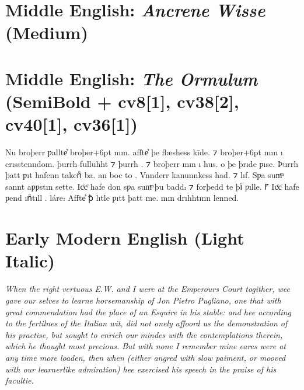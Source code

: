 \documentclass[12pt,letterpaper,openany]{book}
\begin{document}
\section{Middle English: \textit{Ancrene Wisse} (Medium)}

{\large\medium{}}

\section{Middle English: \textit{The Ormulum} (SemiBold + cv8[1], cv38[2], cv40[1], cv36[1])}

{\large\semibold{}
Nu broþerr ƿallte͛ broþer\kern-6ptᫍ\kern+6pt{} mın. affte͛ þe flæshess kīde. ⁊
broþer\kern-6ptᫍ\kern+6pt{} mın ı crısstenndom.
þurrh fulluhht ⁊ þurrh . ⁊ broþerr mın ı  hus.
 o þe þrıde ƿıse.
Þurrh þatt ƿıt hafenn takenᷠ ba. an  boc to .
Vnnderr kanunnkess had.
⁊ lıf. Sƿa sumͫ sannt aƿƿstın sette. Icͨcͨ hafe don sƿa sumͫ þu badd⹎ ⁊ forþedd te
þıᷠ ƿılle. ⹍ Icͨcͨ hafe ƿend ınᷠtıll . 
 láre⹎ Affte͛ ꝥ lıtᫎle
ƿıtt þatt me. mın drıhhtınn  lenned.}

\section{Early Modern English (Light Italic)}

\textit{\large\itallight{}When the right vertuous E.W. and I were at the Emperours Court to\-gither, wee gave our selves to learne horsemanship of Jon Pietro Pugliano, one that with great commendation had the place of an Esquire in his stable: and hee according to the fertilnes of the Italian wit, did not onely affoord us the demonstration of his practise, but sought to enrich our \mbox{mindes} with the contemplations therein, which he thought most precious. But with none I remember mine eares were at any time more loaden, then when (either angred with slow paiment, or mooved with our learnerlike admiration) hee exercised his speech in the praise of his facultie.}
\end{document}
